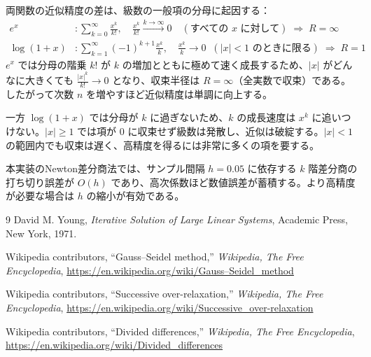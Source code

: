 \documentclass[12pt,a4paper]{ltjsreport}
\begin{document}
両関数の近似精度の差は、級数の一般項の分母に起因する：
\begin{align}
e^x      &: \sum_{k=0}^{\infty} \frac{x^k}{k!}, \quad \frac{x^k}{k!} \xrightarrow{k\to\infty} 0 \quad (\text{すべての }x\text{ に対して}) \;\Rightarrow\; R = \infty \\[4pt]
\log(1+x) &: \sum_{k=1}^{\infty} (-1)^{k+1}\frac{x^k}{k}, \quad \frac{x^k}{k} \to 0 \;\;(|x| < 1\text{ のときに限る}) \;\Rightarrow\; R = 1
\end{align}
$e^x$ では分母の階乗 $k!$ が $k$ の増加とともに極めて速く成長するため、$|x|$ がどんなに大きくても $\frac{|x|^k}{k!} \to 0$ となり、収束半径は $R = \infty$（全実数で収束）である。したがって次数 $n$ を増やすほど近似精度は単調に向上する。

一方 $\log(1+x)$ では分母が $k$ に過ぎないため、$k$ の成長速度は $x^k$ に追いつけない。$|x| \geq 1$ では項が $0$ に収束せず級数は発散し、近似は破綻する。$|x| < 1$ の範囲内でも収束は遅く、高精度を得るには非常に多くの項を要する。

本実装のNewton差分商法では、サンプル間隔 $h = 0.05$ に依存する $k$ 階差分商の打ち切り誤差が $O(h)$ であり、高次係数ほど数値誤差が蓄積する。より高精度が必要な場合は $h$ の縮小が有効である。

\begin{thebibliography}{9}
David M. Young,
\emph{Iterative Solution of Large Linear Systems},
Academic Press, New York, 1971.

Wikipedia contributors,
``Gauss–Seidel method,'' \emph{Wikipedia, The Free Encyclopedia},
\url{https://en.wikipedia.org/wiki/Gauss–Seidel_method}

Wikipedia contributors,
``Successive over-relaxation,'' \emph{Wikipedia, The Free Encyclopedia},
\url{https://en.wikipedia.org/wiki/Successive_over-relaxation}

Wikipedia contributors,
``Divided differences,'' \emph{Wikipedia, The Free Encyclopedia},
\url{https://en.wikipedia.org/wiki/Divided_differences}
\end{thebibliography}
\end{document}
